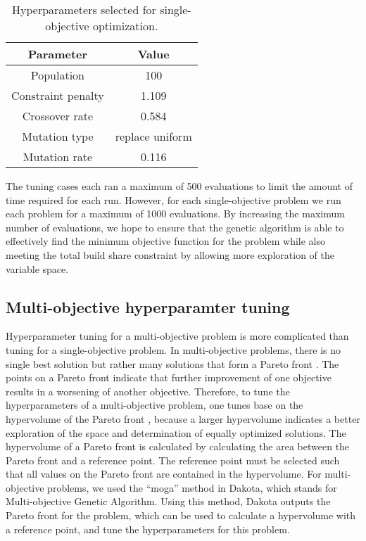 \begin{table}
    \centering
    \caption{Hyperparameters selected for single-objective optimization.}
    \label{tab:soga_parameters}
    \begin{tabular}{c c}
        \hline
        Parameter & Value \\
        \hline
        Population & 100 \\
        Constraint penalty & 1.109\\
        Crossover rate & 0.584\\
        Mutation type & replace uniform\\
        Mutation rate & 0.116\\
        \hline
    \end{tabular}
\end{table}

The tuning cases each ran a maximum of 500 evaluations to limit the 
amount of time required for each run. However, for each single-objective 
problem we run each problem for a maximum of 1000 evaluations. By 
increasing the maximum number of evaluations, we hope to ensure that 
the genetic algorithm is able to effectively find the minimum objective 
function for the problem while also meeting the total build share 
constraint by allowing more exploration of the variable space. 

\subsection{Multi-objective hyperparamter tuning}
Hyperparameter tuning for a multi-objective problem is more complicated 
than tuning for a single-objective problem. In multi-objective 
problems, there is no single best solution but rather many solutions 
that form a Pareto front \cite{adams_dakota_2021}. The points on a 
Pareto front indicate that further improvement of one objective 
results in a worsening of another objective. Therefore, to tune the 
hyperparameters of a multi-objective problem, one tunes base on the 
hypervolume of the Pareto front \cite{deb_multi-objective_2001}, because 
a larger hypervolume indicates a better exploration of the space and 
determination of equally optimized solutions. The 
hypervolume of a Pareto front is calculated by calculating the area 
between the Pareto front and a reference point. The reference point 
must be selected such that all values on the Pareto front are contained in 
the hypervolume. For multi-objective problems, we used the ``moga'' method 
in Dakota, which 
stands for Multi-objective Genetic Algorithm. Using this method, Dakota
outputs the Pareto front for the problem, which can be used to calculate 
a hypervolume with a reference point, and 
tune the hyperparameters for this problem. 

